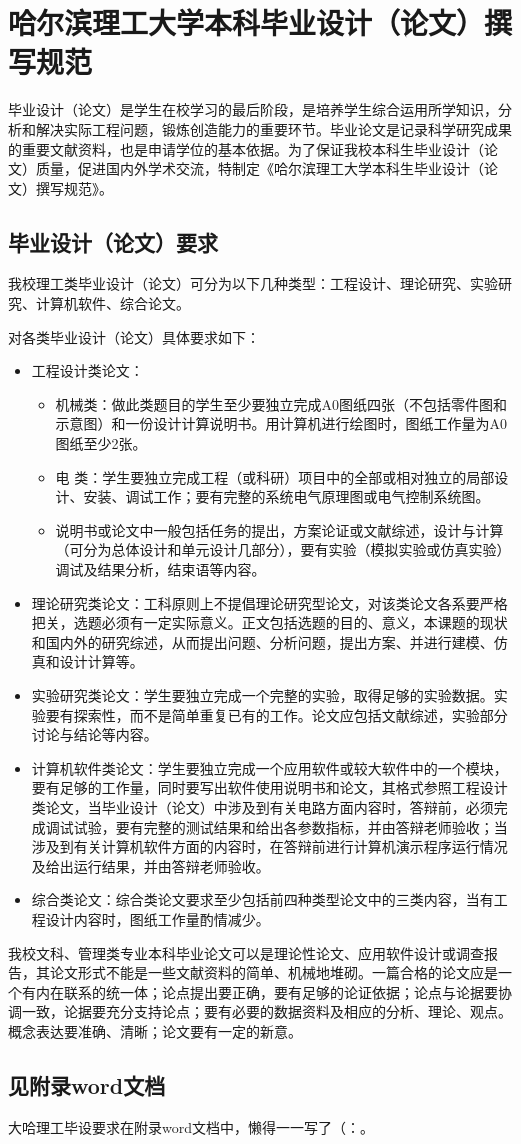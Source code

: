 \chapter{哈尔滨理工大学本科毕业设计（论文）撰写规范}
毕业设计（论文）是学生在校学习的最后阶段，是培养学生综合运用所学知识，分析和解决实际工程问题，锻炼创造能力的重要环节。毕业论文是记录科学研究成果的重要文献资料，也是申请学位的基本依据。为了保证我校本科生毕业设计（论文）质量，促进国内外学术交流，特制定《哈尔滨理工大学本科生毕业设计（论文）撰写规范》。
	\section{毕业设计（论文）要求}
我校理工类毕业设计（论文）可分为以下几种类型：工程设计、理论研究、实验研究、计算机软件、综合论文。

对各类毕业设计（论文）具体要求如下：
		\begin{itemize}\denseenum
			\item 工程设计类论文：
				\begin{itemize}\denseenum
					\item 机械类：做此类题目的学生至少要独立完成A0图纸四张（不包括零件图和示意图）和一份设计计算说明书。用计算机进行绘图时，图纸工作量为A0图纸至少2张。
					\item 电  类：学生要独立完成工程（或科研）项目中的全部或相对独立的局部设计、安装、调试工作；要有完整的系统电气原理图或电气控制系统图。
					\item 说明书或论文中一般包括任务的提出，方案论证或文献综述，设计与计算（可分为总体设计和单元设计几部分），要有实验（模拟实验或仿真实验）调试及结果分析，结束语等内容。
				\end{itemize}
			\item 理论研究类论文：工科原则上不提倡理论研究型论文，对该类论文各系要严格把关，选题必须有一定实际意义。正文包括选题的目的、意义，本课题的现状和国内外的研究综述，从而提出问题、分析问题，提出方案、并进行建模、仿真和设计计算等。
			\item 实验研究类论文：学生要独立完成一个完整的实验，取得足够的实验数据。实验要有探索性，而不是简单重复已有的工作。论文应包括文献综述，实验部分讨论与结论等内容。
			\item 计算机软件类论文：学生要独立完成一个应用软件或较大软件中的一个模块，要有足够的工作量，同时要写出软件使用说明书和论文，其格式参照工程设计类论文，当毕业设计（论文）中涉及到有关电路方面内容时，答辩前，必须完成调试试验，要有完整的测试结果和给出各参数指标，并由答辩老师验收；当涉及到有关计算机软件方面的内容时，在答辩前进行计算机演示程序运行情况及给出运行结果，并由答辩老师验收。
			\item 综合类论文：综合类论文要求至少包括前四种类型论文中的三类内容，当有工程设计内容时，图纸工作量酌情减少。
		\end{itemize}

我校文科、管理类专业本科毕业论文可以是理论性论文、应用软件设计或调查报告，其论文形式不能是一些文献资料的简单、机械地堆砌。一篇合格的论文应是一个有内在联系的统一体；论点提出要正确，要有足够的论证依据；论点与论据要协调一致，论据要充分支持论点；要有必要的数据资料及相应的分析、理论、观点。概念表达要准确、清晰；论文要有一定的新意。
	\section{见附录word文档}
	大哈理工毕设要求在附录word文档中，懒得一一写了（：。
